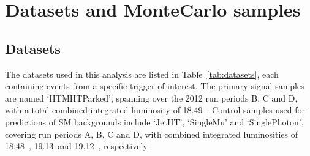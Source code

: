 \chapter{Datasets and MonteCarlo samples}
\label{ch:samples}

\ifpdf
    \graphicspath{{Chapter5_2/Figs/Raster/}{Chapter5_2/Figs/PDF/}{Chapter5_2/Figs/}}
\else
    \graphicspath{{Chapter5_2/Figs/Vector/}{Chapter5_2/Figs/}}
\fi

\section{Datasets}

The datasets used in this analysis are listed in Table~\ref{tab:datasets}, each containing
events from a specific trigger of interest. The primary 
signal samples are named `HTMHTParked', spanning over the 2012 run periods B, C and D,
with a total combined integrated luminosity of 18.49~\fb. Control samples used for
predictions of SM backgrounds include `JetHT', `SingleMu' and `SinglePhoton', covering 
run periods A, B, C and D, with
combined integrated luminosities of 18.48~\fb, 19.13~\fb and 19.12~\fb, respectively.

